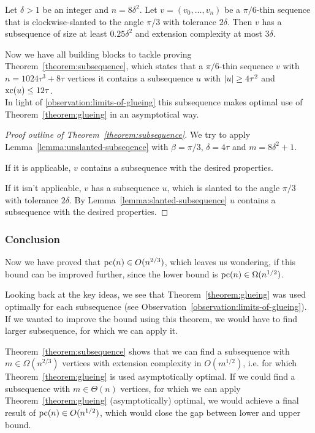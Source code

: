 \begin{lemma}\label{lemma:slanted-subsequence}
  Let $\delta>1$ be an integer and $n=8\delta^2$. Let $v=(v_0,\ldots,v_n)$ be a $\pi/6$-thin sequence that is clockwise-slanted to the angle $\pi/3$ with tolerance $2\delta$. Then $v$ has a subsequence of size at least $0.25\delta^2$ and extension complexity at most $3\delta$.
\end{lemma}

Now we have all building blocks to tackle proving Theorem~\ref{theorem:subsequence}, which states that a $\pi/6$-thin sequence $v$ with $n = 1024\tau^3 + 8\tau$ vertices it contains a subsequence $u$ with $\lvert u\rvert \geq 4\tau^2$ and $\operatorname{xc}(u) \leq 12\tau$.\\
In light of \ref{observation:limits-of-glueing} this subsequence makes optimal use of Theorem~\ref{theorem:glueing} in an asymptotical way.

\begin{proof}[Proof outline of Theorem~\ref{theorem:subsequence}]
  We try to apply Lemma~\ref{lemma:unslanted-subseqence} with $\beta = \pi/3$, $\delta = 4\tau$ and $m = 8\delta^2 + 1$.

  If it is applicable, $v$ contains a subsequence with the desired properties.

  If it isn't applicable, $v$ has a subsequence $u$, which is slanted to the angle $\pi/3$ with tolerance $2\delta$. By Lemma~\ref{lemma:slanted-subsequence} $u$ contains a subsequence with the desired properties.
\end{proof}



\subsubsection{Conclusion}

Now we have proved that $\operatorname{pc}(n) \in O(n^{2/3})$, which leaves us wondering, if this bound can be improved further, since the lower bound is $\operatorname{pc}(n) \in \Omega(n^{1/2})$.

Looking back at the key ideas, we see that Theorem~\ref{theorem:glueing} was used optimally for each subsequence (see Observation~\ref{observation:limits-of-glueing}). If we wanted to improve the bound using this theorem, we would have to find larger subsequence, for which we can apply it.

Theorem~\ref{theorem:subsequence} shows that we can find a subsequence with $m\in\Omega(n^{2/3})$ vertices with extension complexity in $O(m^{1/2})$, i.e. for which Theorem~\ref{theorem:glueing} is used asymptotically optimal. If we could find a subsequence with $m\in\Theta(n)$ vertices, for which we can apply Theorem~\ref{theorem:glueing} (asymptotically) optimal, we would achieve a final result of $\operatorname{pc}(n)\in O(n^{1/2})$, which would close the gap between lower and upper bound.


